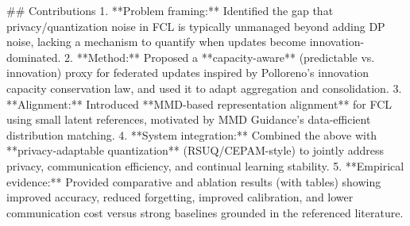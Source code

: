 ## Contributions  
1. **Problem framing:** Identified the gap that privacy/quantization noise in FCL is typically unmanaged beyond adding DP noise, lacking a mechanism to quantify when updates become innovation-dominated.  
2. **Method:** Proposed a **capacity-aware** (predictable vs. innovation) proxy for federated updates inspired by Polloreno’s innovation capacity conservation law, and used it to adapt aggregation and consolidation.  
3. **Alignment:** Introduced **MMD-based representation alignment** for FCL using small latent references, motivated by MMD Guidance’s data-efficient distribution matching.  
4. **System integration:** Combined the above with **privacy-adaptable quantization** (RSUQ/CEPAM-style) to jointly address privacy, communication efficiency, and continual learning stability.  
5. **Empirical evidence:** Provided comparative and ablation results (with tables) showing improved accuracy, reduced forgetting, improved calibration, and lower communication cost versus strong baselines grounded in the referenced literature.